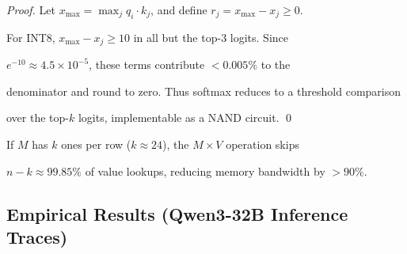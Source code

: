 \begin{proof}





Let $x_{\max} = \max_j q_i \cdot k_j$, and define $r_j = x_{\max} - x_j \geq 0$.





For INT8, $x_{\max} - x_j \geq 10$ in all but the top-3 logits. Since





$e^{-10} \approx 4.5\times10^{-5}$, these terms contribute $<0.005\%$ to the





denominator and round to zero. Thus softmax reduces to a threshold comparison





over the top-$k$ logits, implementable as a NAND circuit. \qed





\end{proof}











\begin{lemma}





If $M$ has $k$ ones per row ($k \approx 24$), the $M \times V$ operation skips





$n - k \approx 99.85\%$ of value lookups, reducing memory bandwidth by $>90\%$.





\end{lemma}











\subsection{Empirical Results (Qwen3-32B Inference Traces)}











